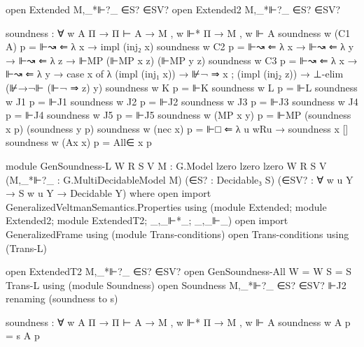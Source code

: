 \begin{spverbatim}
    open Extended M,_*⊩?_ ∈S? ∈SV?
    open Extended2 M,_*⊩?_ ∈S? ∈SV?

    soundness : ∀ {w A Π} → Π ⊢ A → M , w ⊩* Π → M , w ⊩ A
    soundness {w} (C1 {A}) p = ⊩↝ ⇐ λ x → impl (inj₂ x)
    soundness {w} C2 p = ⊩↝ ⇐ λ x → ⊩↝ ⇐ λ y → ⊩↝ ⇐ λ z → ⊩MP (⊩MP x z) (⊩MP y z)
    soundness {w} C3 p = ⊩↝ ⇐ λ {x → ⊩↝ ⇐ λ y → case x of λ { (impl (inj₁ x)) → ⊮¬ ⇒ x
      ; (impl (inj₂ z)) → ⊥-elim (⊮→¬⊩ (⊩¬ ⇒ z) y)}}
    soundness {w} K p = ⊩K
    soundness {w} L p = ⊩L
    soundness {w} J1 p = ⊩J1
    soundness {w} J2 p = ⊩J2
    soundness {w} J3 p = ⊩J3
    soundness {w} J4 p = ⊩J4
    soundness {w} J5 p = ⊩J5
    soundness {w} (MP x y) p = ⊩MP (soundness x p) (soundness y p)
    soundness {w} (nec x) p = ⊩□ ⇐ λ {u} wRu → soundness x []
    soundness {w} (Ax x) p = All∈ x p

module GenSoundness-L
  {W R S V}
  {M : G.Model {lzero} {lzero} {lzero} W R S V}
  (M,_*⊩?_ : G.MultiDecidableModel M)
  (∈S? : Decidable₃ S)
  (∈SV? : ∀ {w u Y} → S w u Y → Decidable Y)
  where
  open import GeneralizedVeltmanSemantics.Properties using (module Extended; module Extended2; module ExtendedT2; _,_⊩*_; _,_⊩_)
  open import GeneralizedFrame using (module Trans-conditions)
  open Trans-conditions using (Trans-L)

  open ExtendedT2 M,_*⊩?_ ∈S? ∈SV?
  open GenSoundness-All {W = W} {S = S} Trans-L using (module Soundness)
  open Soundness M,_*⊩?_ ∈S? ∈SV? ⊩J2 renaming (soundness to s)

  soundness : ∀ {w A Π} → Π ⊢ A → M , w ⊩* Π → M , w ⊩ A
  soundness {w} A p = s A p
\end{spverbatim}
